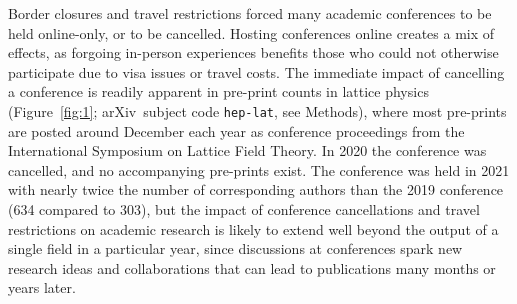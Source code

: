 \documentclass[]{rsos}%
\newcommand{\arxiv}{arXiv}
\newcommand{\add}[1]{\textcolor{blue}{#1}}
\begin{document}
Border closures and travel restrictions forced many academic conferences to be held online-only, or to be cancelled. Hosting conferences online creates a mix of effects, as forgoing in-person experiences benefits those who could not otherwise participate due to visa issues or travel costs\cite{Guinnessy:2021}. The immediate impact of cancelling a conference is readily apparent in pre-print counts in lattice physics (Figure~\ref{fig:1}; \arxiv\ subject code \texttt{hep-lat}, see Methods), where most pre-prints are posted around December each year as conference proceedings from the International Symposium on Lattice Field Theory. In 2020 the conference was cancelled\cite{LatticeConferenceWebsite}, and no accompanying pre-prints exist. The conference was held in 2021 with nearly twice the number of corresponding authors than the 2019 conference\cite{LatticeConferenceWebsite2019,LatticeConferenceWebsite2021} (634 compared to 303), but the impact of conference cancellations and travel restrictions on academic research is likely to extend well beyond the output of a single field in a particular year, since discussions at conferences spark new research ideas and collaborations that can lead to publications many months or years later\cite{Wang:2017}.





\end{document}
